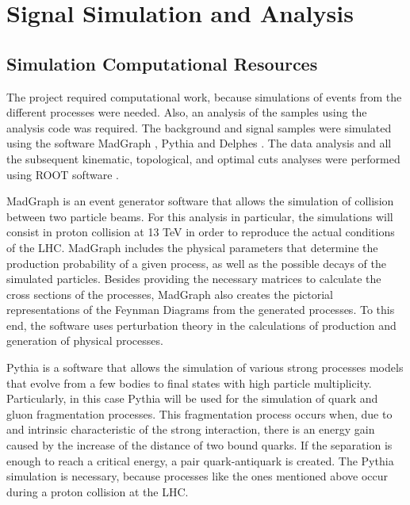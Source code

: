 \chapter{Signal Simulation and Analysis} 

\section{Simulation Computational Resources} \label{sec: simulation}


The project required computational work, because simulations of events from the different processes were needed. Also, an analysis of the samples using the analysis code was required. The background and signal samples were simulated using the software MadGraph \cite{MadGraph}, Pythia \cite{Pythia} and Delphes \cite{Delphes}. The data analysis and all the subsequent kinematic, topological, and optimal cuts analyses were performed using ROOT software \cite{ROOT}.

MadGraph is an event generator software that allows the simulation of collision between two particle beams. For this analysis in particular, the simulations will consist in proton collision at 13 TeV in order to reproduce the actual conditions of the LHC. MadGraph includes the physical parameters that determine the production probability of a given process, as well as the possible decays of the simulated particles. Besides providing the necessary matrices to calculate the cross sections of the processes, MadGraph also creates the pictorial representations of the Feynman Diagrams from the generated processes. To this end, the software uses perturbation theory in the calculations of production and generation of physical processes.

Pythia is a software that allows the simulation of various strong processes models that evolve from a few bodies to final states with high particle multiplicity. Particularly, in this case Pythia will be used for the simulation of quark and gluon fragmentation processes. This fragmentation process occurs when, due to and intrinsic characteristic of the strong interaction, there is an energy gain caused by the increase of the distance of two bound quarks. If the separation is enough to reach a critical energy, a pair quark-antiquark is created. The Pythia simulation is necessary, because processes like the ones mentioned above occur during a proton collision at the LHC.

